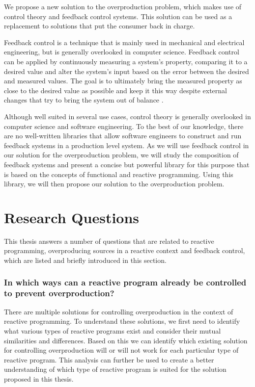 We propose a new solution to the overproduction problem, which makes use of control theory and feedback control systems. This solution can be used as a replacement to solutions that put the consumer back in charge.

Feedback control is a technique that is mainly used in mechanical and electrical engineering, but is generally overlooked in computer science. Feedback control can be applied by continuously measuring a system's property, comparing it to a desired value and alter the system's input based on the error between the desired and measured values. The goal is to ultimately bring the measured property as close to the desired value as possible and keep it this way despite external changes that try to bring the system out of balance \cite{janert2013-feedback}.

Although well suited in several use cases, control theory is generally overlooked in computer science and software engineering. To the best of our knowledge, there are no well-written libraries that allow software engineers to construct and run feedback systems in a production level system. As we will use feedback control in our solution for the overproduction problem, we will study the composition of feedback systems and present a concise but powerful library for this purpose that is based on the concepts of functional and reactive programming. Using this library, we will then propose our solution to the overproduction problem.

\section{Research Questions}
This thesis answers a number of questions that are related to reactive programming, overproducing sources in a reactive context and feedback control, which are listed and briefly introduced in this section.

\subsubsection{In which ways can a reactive program already be controlled to prevent overproduction?}
There are multiple solutions for controlling overproduction in the context of reactive programming. To understand these solutions, we first need to identify what various types of reactive programs exist and consider their mutual similarities and differences. Based on this we can identify which existing solution for controlling overproduction will or will not work for each particular type of reactive program. This analysis can further be used to create a better understanding of which type of reactive program is suited for the solution proposed in this thesis.

